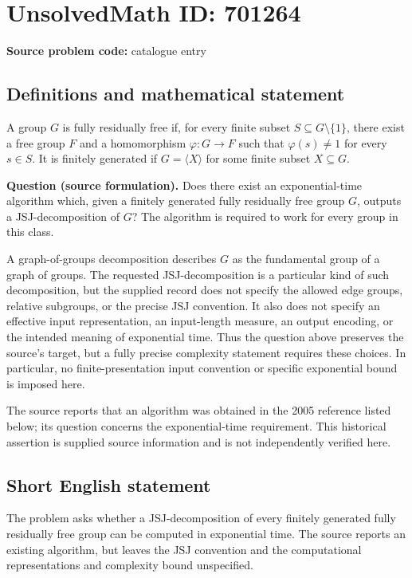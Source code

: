\documentclass[11pt]{article}
\begin{document}
\section*{UnsolvedMath ID: 701264}
\textbf{Source problem code:} catalogue entry
\subsection{Definitions and mathematical statement}
A group \(G\) is fully residually free if, for every finite subset \(S\subseteq G\setminus\{1\}\), there exist a free group \(F\) and a homomorphism \(\varphi:G\to F\) such that \(\varphi(s)\ne 1\) for every \(s\in S\). It is finitely generated if \(G=\langle X\rangle\) for some finite subset \(X\subseteq G\).

\textbf{Question (source formulation).} Does there exist an exponential-time algorithm which, given a finitely generated fully residually free group \(G\), outputs a JSJ-decomposition of \(G\)? The algorithm is required to work for every group in this class.

A graph-of-groups decomposition describes \(G\) as the fundamental group of a graph of groups. The requested JSJ-decomposition is a particular kind of such decomposition, but the supplied record does not specify the allowed edge groups, relative subgroups, or the precise JSJ convention. It also does not specify an effective input representation, an input-length measure, an output encoding, or the intended meaning of exponential time. Thus the question above preserves the source's target, but a fully precise complexity statement requires these choices. In particular, no finite-presentation input convention or specific exponential bound is imposed here.

The source reports that an algorithm was obtained in the 2005 reference listed below; its question concerns the exponential-time requirement. This historical assertion is supplied source information and is not independently verified here.
\subsection{Short English statement}
The problem asks whether a JSJ-decomposition of every finitely generated fully residually free group can be computed in exponential time. The source reports an existing algorithm, but leaves the JSJ convention and the computational representations and complexity bound unspecified.
\end{document}
